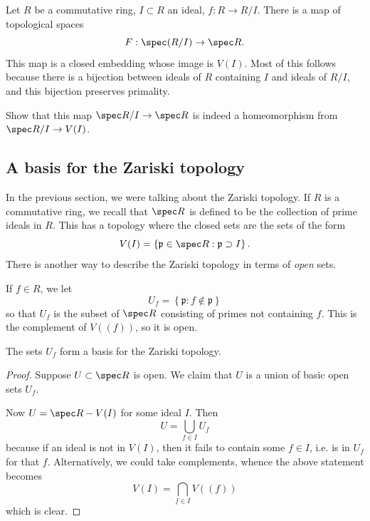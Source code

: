 \begin{example} 
Let $R$ be a commutative ring, $I \subset R$ an ideal, $f: R \to
R/I$. There is a map
of topological spaces
\[ F: \spec (R/I) \to \spec R  .\]
This map is a closed embedding whose image is $V(I)$. Most of
this follows because
there is a bijection between ideals of $R$ containing $I$ and
ideals of $R/I$, and this bijection preserves primality.

\begin{exercise} 
Show that this map $\spec R/I \to \spec R$ is indeed a
homeomorphism from $\spec R/I
\to V(I)$.  
\end{exercise} 
\end{example} 


\subsection{A basis for the Zariski topology}
In the previous section, we were talking about the Zariski
topology. If $R$ is a
commutative ring, we recall that $\spec R$ is defined to be the
collection of
prime ideals in $R$. This has a topology where the closed sets
are the sets of
the form
\[ V(I) = \left\{\mathfrak{p} \in \spec R: \mathfrak{p} \supset
I\right\} . \]
There is another way to describe the Zariski topology in terms
of
\emph{open} sets.  

\begin{definition} 
If $f \in R$, we let 
\[ U_f = \left\{\mathfrak{p}: f \notin \mathfrak{p}\right\}  \]
so that $U_f$ is the subset of $\spec R$ consisting of primes
not containing
$f$. This is the complement of $V((f))$, so it is open.  
\end{definition} 

\begin{proposition} 
The sets $U_f$ form a basis for the Zariski topology. 
\end{proposition} 

\begin{proof} 
Suppose $U \subset \spec R$ is open. We claim that $U$ is a
union of basic
open sets $U_f$. 

Now $U = \spec R - V(I)$ for some ideal $I$.  Then
\[ U = \bigcup_{f \in I} U_f  \]
because if an ideal is not in $V(I)$, then it fails to contain
some $f \in I$,
i.e. is in $U_f$ for that $f$. Alternatively, we could take
complements, whence
the above statement becomes
\[ V(I) = \bigcap_{f \in I} V((f))  \]
which is clear.
\end{proof} 

